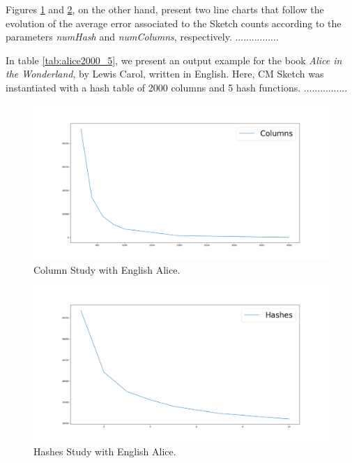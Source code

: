 \documentclass[shortpaper]{revdetua}
\begin{document}
Figures \ref{fig:columnStudy} and \ref{fig:hashStudy}, on the other hand, present two line charts that follow the evolution of the average error associated to 
the Sketch counts according to the parameters \textit{numHash} and \textit{numColumns}, respectively.
................

In table \ref{tab:alice2000_5}, we present an output example for the book \textit{Alice in the Wonderland}, by Lewis Carol, written in English.
Here, CM Sketch was instantiated with a hash table of 2000 columns and 5 hash functions.
................

\begin{figure}[h]
    \centering
    \setlength{\belowcaptionskip}{-12pt}
    \includegraphics[width=\linewidth]{englishAliceColumnStudy200_4000.png}
    \caption{Column Study with English Alice.} 
    \label{fig:columnStudy}
\end{figure}

\begin{figure}[h]
    \centering
    \setlength{\belowcaptionskip}{-12pt}
    \includegraphics[width=\linewidth]{englishAliceHashesStudy1_10.png}
    \caption{Hashes Study with English Alice.} 
    \label{fig:hashStudy}
\end{figure}
\end{document}
